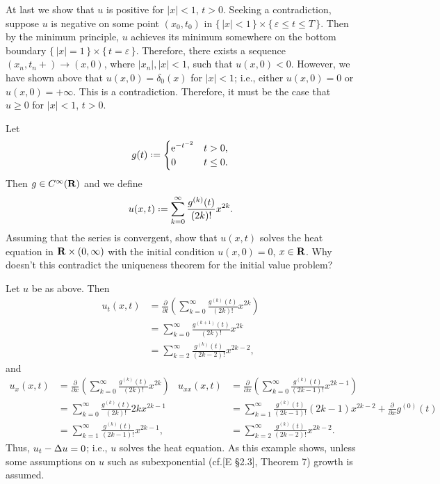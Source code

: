 \begin{solution*}
  At last we show that \(u\) is positive for \(|x|<1\), \(t>0\). Seeking a
  contradiction, suppose \(u\) is negative on some point \((x_0,t_0)\) in
  \(\{\,|x|<1\,\}\times\{\,\varepsilon\leq t\leq T\,\}\). Then by the
  minimum principle, \(u\) achieves its minimum somewhere on the bottom
  boundary \(\{\,|x|=1\,\}\times\{\,t=\varepsilon\,\}\). Therefore, there
  exists a sequence \((x_n,t_n{+})\to (x,0)\), where \(|x_n|,|x|<1\),
  such that \(u(x,0)<0\). However, we have shown above that
  \(u(x,0)=\delta_0(x)\) for \(|x|<1\); i.e., either \(u(x,0)=0\) or
  \(u(x,0)=+\infty\). This is a contradiction. Therefore, it must be the
  case that \(u\geq 0\) for \(|x|<1\), \(t>0\).
\end{solution*}

\begin{problem}
  Let
  \[
    g(t)\defeq
    \begin{cases}
      \rme^{-t^{-2}}&t>0,\\
      0&t\leq 0.
    \end{cases}
  \]
  Then \(g\in C^\infty(\mathbf{R})\) and we define
  \[
    u(x,t)\defeq\sum_{k=0}^\infty\frac{g^{(k)}(t)}{(2k)!}x^{2k}.
  \]
  Assuming that the series is convergent, show that \(u(x,t)\) solves the
  heat equation in \(\mathbf{R}\times(0,\infty)\) with the initial condition
  \(u(x,0)=0\), \(x\in\mathbf{R}\). Why doesn't this contradict the uniqueness
  theorem for the initial value problem?
\end{problem}
\begin{solution*}
  Let \(u\) be as above. Then
  \begin{align*}
    u_t(x,t)
    &=\frac{\partial}{\partial t}
      \left(
      \sum_{k=0}^\infty\frac{g^{(k)}(t)}{(2k)!}x^{2k}
      \right)\\
    &=\sum_{k=0}^\infty \frac{g^{(k+1)}(t)}{(2k)!}x^{2k}\\
    &=\sum_{k=2}^\infty \frac{g^{(k)}(t)}{(2k-2)!}x^{2k-2},
  \end{align*}
  and
  \begin{align*}
    u_x(x,t)
    &=\frac{\partial}{\partial x}
      \left(
      \sum_{k=0}^\infty\frac{g^{(k)}(t)}{(2k)!}x^{2k}
      \right)
    &u_{xx}(x,t)
    &=\frac{\partial}{\partial x}
      \left(
      \sum_{k=0}^\infty\frac{g^{(k)}(t)}{(2k-1)!}x^{2k-1}
      \right)\\
    &=\sum_{k=0}^\infty\frac{g^{(k)}(t)}{(2k)!} 2kx^{2k-1}
    &&=\sum_{k=1}^\infty \frac{g^{(k)}(t)}{(2k-1)!}(2k-1)x^{2k-2}
       +\frac{\partial}{\partial x}g^{(0)}(t)\\
    &=\sum_{k=1}^\infty\frac{g^{(k)}(t)}{(2k-1)!}x^{2k-1},
    &&=\sum_{k=2}^\infty\frac{g^{(k)}(t)}{(2k-2)!}x^{2k-2}.
  \end{align*}
  Thus, \(u_t-\Delta u=0\); i.e., \(u\) solves the heat equation. As this
  example shows, unless some assumptions on \(u\) such as subexponential
  (cf.\@ [E \S 2.3], Theorem 7) growth is assumed.
\end{solution*}

